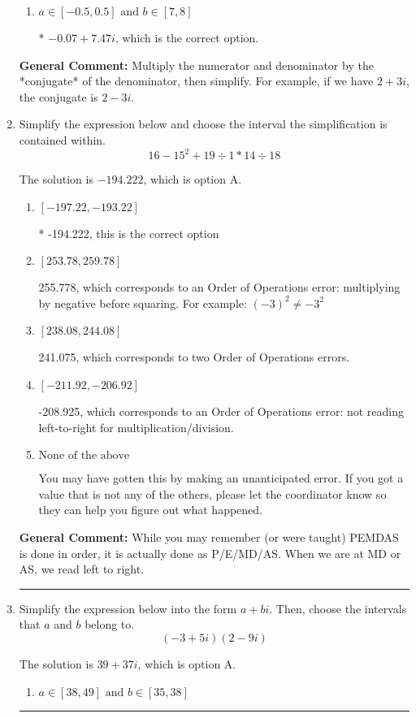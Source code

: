 \documentclass{extbook}[14pt]
\newcommand{\litem}[1]{\item #1

\rule{\textwidth}{0.4pt}}
\begin{document}
\begin{enumerate}
{\begin{enumerate}[label=\Alph*.]
 $-0.07  + 336.00 i$, which corresponds to forgetting to multiply the conjugate by the numerator.
\item \( a \in [-0.5, 0.5] \text{ and } b \in [7, 8] \)

* $-0.07  + 7.47 i$, which is the correct option.
\end{enumerate}

\textbf{General Comment:} Multiply the numerator and denominator by the *conjugate* of the denominator, then simplify. For example, if we have $2+3i$, the conjugate is $2-3i$.
}
\litem{
Simplify the expression below and choose the interval the simplification is contained within.
\[ 16 - 15^2 + 19 \div 1 * 14 \div 18 \]

The solution is \( -194.222 \), which is option A.\begin{enumerate}[label=\Alph*.]
\item \( [-197.22, -193.22] \)

* -194.222, this is the correct option
\item \( [253.78, 259.78] \)

 255.778, which corresponds to an Order of Operations error: multiplying by negative before squaring. For example: $(-3)^2 \neq -3^2$
\item \( [238.08, 244.08] \)

 241.075, which corresponds to two Order of Operations errors.
\item \( [-211.92, -206.92] \)

 -208.925, which corresponds to an Order of Operations error: not reading left-to-right for multiplication/division.
\item \( \text{None of the above} \)

 You may have gotten this by making an unanticipated error. If you got a value that is not any of the others, please let the coordinator know so they can help you figure out what happened.
\end{enumerate}

\textbf{General Comment:} While you may remember (or were taught) PEMDAS is done in order, it is actually done as P/E/MD/AS. When we are at MD or AS, we read left to right.
}
\litem{
Simplify the expression below into the form $a+bi$. Then, choose the intervals that $a$ and $b$ belong to.
\[ (-3 + 5 i)(2 - 9 i) \]

The solution is \( 39 + 37 i \), which is option A.\begin{enumerate}[label=\Alph*.]
\item \( a \in [38, 49] \text{ and } b \in [35, 38] \)


\end{enumerate}}
\end{enumerate}
\end{document}
